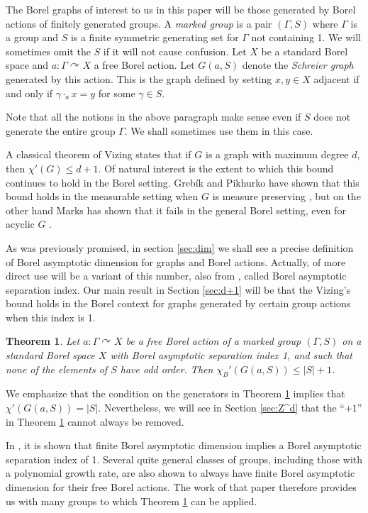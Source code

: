\documentclass[12pt]{article}
\newcommand{\0}{\varnothing}
\newtheorem{theorem}{Theorem}
\begin{document}
The Borel graphs of interest to us in this paper will be those generated by Borel actions of finitely generated groups. A \textit{marked group} is a pair $(\Gamma,S)$ where $\Gamma$ is a group and $S$ is a finite symmetric generating set for $\Gamma$ not containing 1. We will sometimes omit the $S$ if it will not cause confusion. Let $X$ be a standard Borel space and $a:\Gamma \curvearrowright X$ a free Borel action. Let $G(a,S)$ denote the \textit{Schreier graph} generated by this action. This is the graph defined by setting $x,y \in X$ adjacent if and only if $\gamma \cdot_a x = y$ for some $\gamma \in S$.

Note that all the notions in the above paragraph make sense even if $S$ does not generate the entire group $\Gamma$. We shall sometimes use them in this case.

A classical theorem of Vizing states that if $G$ is a graph with maximum degree $d$, then $\chi'(G) \leq d+1$. Of natural interest is the extent to which this bound continues to hold in the Borel setting. Greb\'{i}k and Pikhurko have shown that this bound holds in the measurable setting when $G$ is measure preserving \cite{GP}, but on the other hand Marks has shown that it fails in the general Borel setting, even for acyclic $G$ \cite{M15}.

As was previously promised, in section \ref{sec:dim} we shall see a precise definition of Borel asymptotic dimension for graphs and Borel actions. Actually, of more direct use will be a variant of this number, also from \cite{dim}, called Borel asymptotic separation index. Our main result in Section \ref{sec:d+1} will be that the Vizing's bound holds in the Borel context for graphs generated by certain group actions when this index is 1.

\begin{theorem}\label{th:d+1}
Let $a:\Gamma \curvearrowright X$ be a free Borel action of a marked group $(\Gamma,S)$ on a standard Borel space $X$ with Borel asymptotic separation index 1, and such that none of the elements of $S$ have odd order. Then $\chi_{B}'(G(a,S)) \leq |S|+1$.
\end{theorem}

We emphasize that the condition on the generators in Theorem \ref{th:d+1} implies that $\chi'(G(a,S)) = |S|$. Nevertheless, we will see in Section \ref{sec:Z^d} that the ``$+1$'' in Theorem \ref{th:d+1} cannot always be removed.

In \cite{dim}, it is shown that finite Borel asymptotic dimension implies a Borel asymptotic separation index of 1. Several quite general classes of groups, including those with a polynomial growth rate, are also shown to always have finite Borel asymptotic dimension for their free Borel actions. The work of that paper therefore provides us with many groups to which Theorem \ref{th:d+1} can be applied.
\end{document}
